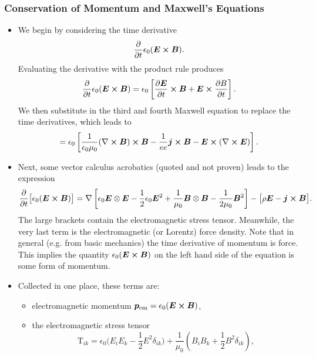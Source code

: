 \documentclass[11pt, a4paper]{article}
\renewcommand{\vec}[1]{\bm{#1}} %
\newcommand{\E}{\vec{E}} %
\newcommand{\B}{\vec{B}} %
\newcommand{\TT}{\mathrm{T}}  %
\newcommand{\ee}{\epsilon_{0}}  %
\newcommand{\mm}{\mu_{0}}  %
\renewcommand{\j}{\vec{j}}  %
\renewcommand{\curl}{\nabla \cross}
\renewcommand{\grad}{\nabla}
\begin{document}
\subsubsection{Conservation of Momentum and Maxwell's Equations}
\begin{itemize}
	\item We begin by considering the time derivative
	\begin{equation*}
		\pdv{t}\ee (\E \cross \B).
	\end{equation*}
	Evaluating the derivative with the product rule produces
	\begin{equation*}
		\pdv{t}\ee (\E \cross \B) = \ee \left[\pdv{\E}{t}\cross \B + \E \cross \pdv{B}{t}\right].
	\end{equation*}
	We then substitute in the third and fourth Maxwell equation to replace the time derivatives, which leads to
	\begin{equation*}
		= \ee \left[\frac{1}{\ee \mm}(\curl \B)\cross \B - \frac{1}{ee}\j \cross \B - \E \cross (\curl \E)\right].
	\end{equation*}
	
    \item Next, some vector calculus acrobatics (quoted and not proven) leads to the expression
	\begin{equation*}
		\pdv{t}\big[\ee (\E \cross \B)\big] = \grad \left[\ee \E \otimes \E - \frac{1}{2}\ee \E^{2} + \frac{1}{\mm} \B \otimes \B - \frac{1}{2\mm}\B^{2}\right] - \big[\rho \E - \j \cross \B\big].
	\end{equation*}
	The large brackets contain the electromagnetic stress tensor. Meanwhile, the very last term is the electromagnetic (or Lorentz) force density. Note that in general (e.g. from basic mechanics) the time derivative of momentum is force. This implies the quantity $ \ee (\E \cross \B) $ on the left hand side of the equation is some form of momentum.
	
	\item Collected in one place, these terms are:
    \begin{itemize}
        \item electromagnetic momentum $ \vec{p}_{\text{em}} = \ee (\E \cross \B) $,

        \item the electromagnetic stress tensor 
        \begin{equation*}
            \TT_{ik} = \ee \big(E_{i}E_{k} - \frac{1}{2}E^{2}\delta_{ik}\big) + \frac{1}{\mm}\left(B_{i}B_{k} + \frac{1}{2}B^{2}\delta_{ik}\right),
        \end{equation*}
        

\end{itemize}
\end{itemize}
\end{document}
